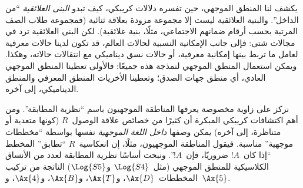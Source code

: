 \documentclass[../../../include/open-logic-section]{subfiles}
\begin{document}
يكشف لنا المنطق الموجهي، حين تفسره دلالات كريبكي، كيف تبدو
\emph{البنى العلائقية} ``من الداخل''. والبنية العلائقية ليست إلا
مجموعة مزودة بعلاقة ثنائية (فمجموعة طلاب الصف المرتبة بحسب أرقام
ضمانهم الاجتماعي، مثلًا، بنية علائقية). لكن البنى العلائقية ترد في
مجالات شتى: فإلى جانب الإمكانية النسبية لحالات العالم، قد تكون لدينا
حالات معرفية لعامل ما تربط بينها إمكانية معرفية، أو حالات نسق
ديناميكي مع انتقالات حالاته، وهكذا. ويمكن استعمال المنطق الموجهي
لنمذجة هذه جميعًا: فالأولى تعطينا المنطق الموجهي العادي، أي منطق جهات
الصدق؛ وتعطينا الأخريات المنطق المعرفي والمنطق الديناميكي، إلى آخره.

نركز على زاوية مخصوصة يعرفها المناطقة الموجهيون باسم ``نظرية
المطابقة''. ومن أهم اكتشافات كريبكي المبكرة أن كثيرًا من خصائص علاقة
الوصول~$R$ (كونها متعدية أو متناظرة، إلى آخره) يمكن وصفها
\emph{داخل اللغة الموجهية} نفسها بواسطة ``مخططات موجهية'' مناسبة.
فيقول المناطقة الموجهيون، مثلًا، إن انعكاسية~$R$ ``تطابق'' المخطط
``إذا كان~$!A$ ضروريًا، فإن~$!A$''. ونبحث أساسًا نظرية المطابقة لعدد
من الأنساق الكلاسيكية للمنطق الموجهي (مثل~$\Log{S4}$ و$\Log{S5}$)
الناتجة من تركيب المخططات~$\Ax{D}$، و$\Ax{T}$، و$\Ax{B}$، و$\Ax{4}$،
و~$\Ax{5}$.
\end{document}
